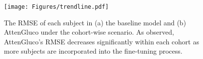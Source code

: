 
\begin{figure}
    \centering
    \texttt{[image: Figures/trendline.pdf]}
    \caption{\small The RMSE of each subject in (a) the baseline model and (b) AttenGluco under the cohort-wise scenario. As observed, AttenGluco's RMSE decreases significantly within each cohort as more subjects are incorporated into the fine-tuning process.}
    \label{fig:trendline}
\end{figure}
